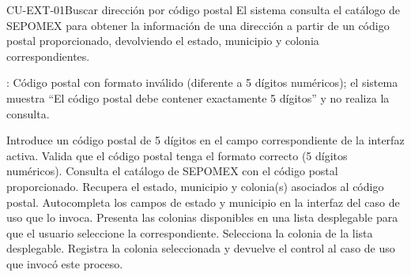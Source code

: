 \begin{UseCase}{CU-EXT-01}{Buscar dirección por código postal}{
		El sistema consulta el catálogo de SEPOMEX para obtener la información de una dirección a partir de un código postal proporcionado, devolviendo el estado, municipio y colonia correspondientes.
	}
{\begin{Titemize}
			: Código postal con formato inválido (diferente a 5 dígitos numéricos); el sistema muestra ``El código postal debe contener exactamente 5 dígitos'' y no realiza la consulta.
		\end{Titemize}
	}
\end{UseCase}
\begin{UCtrayectoria}
	\UCpaso[\UCactor] Introduce un código postal de 5 dígitos en el campo correspondiente de la interfaz activa. 
	\UCpaso Valida que el código postal tenga el formato correcto (5 dígitos numéricos).
	\UCpaso \label{CU-EXT-01.consultaCatalogo} Consulta el catálogo de SEPOMEX con el código postal proporcionado. 
	\UCpaso Recupera el estado, municipio y colonia(s) asociados al código postal.
	\UCpaso Autocompleta los campos de estado y municipio en la interfaz del caso de uso que lo invoca.
	\UCpaso Presenta las colonias disponibles en una lista desplegable para que el usuario seleccione la correspondiente.
	\UCpaso[\UCactor] Selecciona la colonia de la lista desplegable.
	\UCpaso Registra la colonia seleccionada y devuelve el control al caso de uso que invocó este proceso.
\end{UCtrayectoria}


